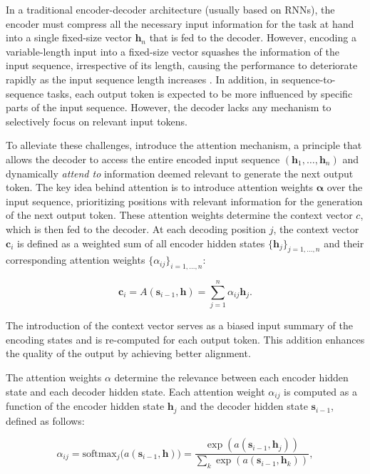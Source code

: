 In a traditional encoder-decoder architecture (usually based on \acp{RNN}), the encoder must compress all the necessary input information for the task at hand into a single fixed-size vector $\bm{h}_n$ that is fed to the decoder. However, encoding a variable-length input into a fixed-size vector squashes the information of the input sequence, irrespective of its length, causing the performance to deteriorate rapidly as the input sequence length increases \citep{cho2014properties}. In addition, in sequence-to-sequence tasks, each output token is expected to be more influenced by specific parts of the input sequence. However, the decoder lacks any mechanism to selectively focus on relevant input tokens.

To alleviate these challenges, \citet{bahdanau2014neural} introduce the attention mechanism, a principle that allows the decoder to access the entire encoded input sequence $(\bm{h}_1, \ldots, \bm{h}_n)$ and dynamically \textit{attend to} information deemed relevant to generate the next output token. The key idea behind attention is to introduce attention weights $\bm{\alpha}$ over the input sequence, prioritizing positions with relevant information for the generation of the next output token. These attention weights determine the context vector $c$, which is then fed to the decoder. At each decoding position $j$, the context vector $\bm{c}_i$ is defined as a weighted sum of all encoder hidden states $\{\bm{h}_j\}_{j=1, \ldots, n}$ and their corresponding attention weights $\{\alpha_{ij}\}_{i=1, \ldots, n}$: 

\begin{equation}
    \bm{c}_i = A(\bm{s}_{i-1}, \bm{h}) = \sum_{j=1}^n \alpha_{ij} \bm{h}_j.
\end{equation}

\noindent The introduction of the context vector serves as a biased input summary of the encoding states and is re-computed for each output token. This addition enhances the quality of the output by achieving better alignment.

The attention weights $\alpha$ determine the relevance between each encoder hidden state and each decoder hidden state. Each attention weight $\alpha_{ij}$ is computed as a function of the encoder hidden state $\bm{h}_j$ and the decoder hidden state $\bm{s}_{i-1}$, defined as follows:

\begin{equation}
    \alpha_{ij} = \textrm{softmax}_j\bigl(a(\bm{s}_{i-1}, \bm{h})\bigr) = \frac{\exp(a(\bm{s}_{i-1}, \bm{h}_j))}{\sum_k \exp(a(\bm{s}_{i-1}, \bm{h}_k))},
\end{equation}

